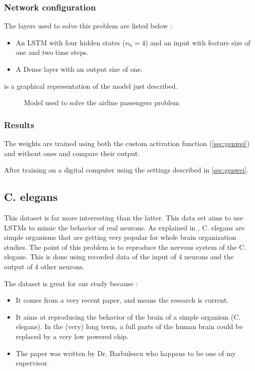 \subsubsection{Network configuration}

The layers used to solve this problem are listed below :

\begin{itemize}
  \item An \ac{LSTM} with four hidden states ($n_h=4$) and an input with feature size of one and two time steps.
  \item A Dense layer with an output size of one.
\end{itemize}

 is a graphical representation of the model just described.

\begin{figure}[H]
  \centering
  
  \caption{Model used to solve the airline passengers problem}
  \label{fig:airlineModel}
\end{figure}

\subsubsection{Results} %

The weights are trained using both the custom activation function (\cref{sec:genwei}) and without ones and compare their output.

After training on a digital computer using the settings described in \cref{sec:genwei}.

\subsection{\ac{C. elegans}}

This dataset is far more interresting than the latter. This data set aims to use \acp{LSTM} to mimic the behavior of real neurons. As explained in \cite{celegans}, \acf{C. elegans} are simple organisms that are getting very popular for whole brain organization studies. The point of this problem is to reproduce the nervous system of the \ac{C. elegans}. This is done using recorded data of the input of 4 neurons and the output of 4 other neurons.

The dataset is great for our study because :
\begin{itemize}
  \item It comes from a very recent paper, and means the research is current.
  \item It aims at reproducing the behavior of the brain of a simple organism (\ac{C. elegans}). In the (very) long term, a full parts of the human brain could be replaced by a very low powered chip.
  \item The paper was written by Dr. Barbulescu who happens to be one of my supervisor.
\end{itemize}

